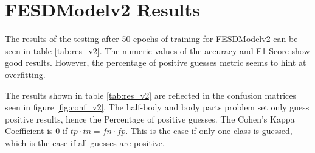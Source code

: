\section{FESDModelv2 Results}

The results of the testing after 50 epochs of training for FESDModelv2 can be seen in table \ref{tab:res_v2}. The numeric values of the accuracy and F1-Score show good results. However, the percentage of positive guesses metric seems to hint at overfitting.



The results shown in table \ref{tab:res_v2} are reflected in the confusion matrices seen in figure \ref{fig:conf_v2}. The half-body and body parts problem set only guess positive results, hence the Percentage of positive guesses. The Cohen's Kappa Coefficient is 0 if $tp \cdot tn = fn \cdot fp$. This is the case if only one class is guessed, which is the case if all guesses are positive.

